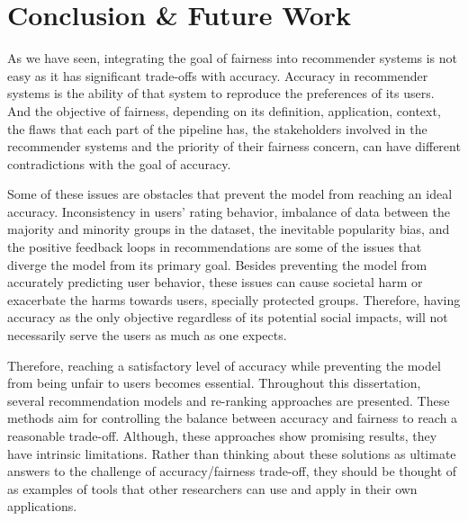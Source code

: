 \chapter{Conclusion \& Future Work}
\label{conclude}


As we have seen, integrating the goal of fairness into recommender systems is not easy as it has significant trade-offs with accuracy. Accuracy in recommender systems is the ability of that system to reproduce the preferences of its users. And the objective of fairness, depending on its definition, application, context, the flaws that each part of the pipeline has, the stakeholders involved in the recommender systems and the priority of their fairness concern, can have different contradictions with the goal of accuracy. 

Some of these issues are obstacles that prevent the model from reaching an ideal accuracy. Inconsistency in users' rating behavior, imbalance of data between the majority and minority groups in the dataset, the inevitable popularity bias, and the positive feedback loops in recommendations are some of the issues that diverge the model from its primary goal. Besides preventing the model from accurately predicting user behavior, these issues can cause societal harm or exacerbate the harms towards users, specially protected groups. Therefore, having accuracy as the only objective regardless of its potential social impacts, will not necessarily serve the users as much as one expects. 

Therefore, reaching a satisfactory level of accuracy while preventing the model from being unfair to users becomes essential. Throughout this dissertation, several recommendation models and re-ranking approaches are presented. These methods aim for controlling the balance between accuracy and fairness to reach a reasonable trade-off. Although, these approaches show promising results, they have intrinsic limitations. Rather than thinking about these solutions as ultimate answers to the challenge of accuracy/fairness trade-off, they should be thought of as examples of tools that other researchers can use and apply in their own applications. 

